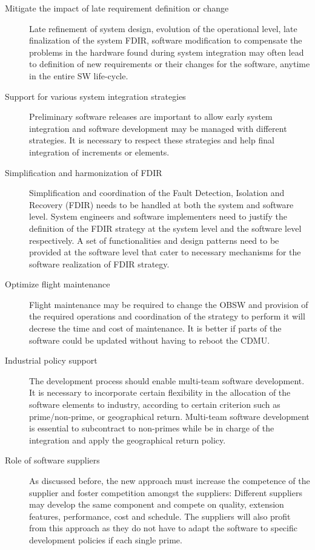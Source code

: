 \begin{description}
\item [Mitigate the impact of late requirement definition or change] Late refinement of system design, evolution of the operational level, late finalization of the system FDIR, software modification to compensate the problems in the hardware found during system integration may often lead to definition of new requirements or their changes for the software, anytime in the entire SW life-cycle.

\item [Support for various system integration strategies] Preliminary software releases are important to allow early system integration and software development may be managed with different strategies. It is necessary to respect these strategies and help final integration of increments or elements.

\item [Simplification and harmonization of FDIR] Simplification and coordination of the Fault Detection, Isolation and Recovery (FDIR) needs to be handled at both the system and software level. System engineers and software implementers need to justify the definition of the FDIR strategy at the system level and the software level respectively. A set of functionalities and design patterns need to be provided at the software level that cater to necessary mechanisms for the software realization of FDIR strategy.

\item [Optimize flight maintenance] Flight maintenance may be required to change the OBSW and provision of the required operations and coordination of the strategy to perform it will decrese the time and cost of maintenance. It is better if parts of the software could be updated without having to reboot the CDMU. 

\item [Industrial policy support] The development process should enable multi-team software development. It is necessary to incorporate certain flexibility in the allocation of the software elements to industry, according to certain criterion such as prime/non-prime, or geographical return. Multi-team software development is essential to subcontract to non-primes while be in charge of the integration and apply the geographical return policy.

\item [Role of software suppliers] As discussed before, the new approach must increase the competence of the supplier and foster competition amongst the suppliers: Different suppliers may develop the same component and compete on quality, extension features, performance, cost and schedule. The suppliers will also profit from this approach as they do not have to adapt the software to specific development policies if each single prime.


\end{description}
